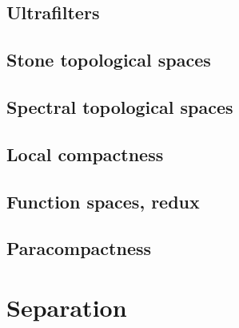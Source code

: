 \documentclass[a4paper,nobib,nols]{tufte-book}
\begin{document}
\section{Ultrafilters}%
\label{sec:ultrafilters}

\section{Stone topological spaces}%
\label{sec:stone_topological_spaces}

\section{Spectral topological spaces}%
\label{sec:spectral_topological_spaces}

\section{Local compactness}%
\label{sec:local_compactness}

\section{Function spaces, redux}%
\label{sec:function_spaces_redux}

\section{Paracompactness}%
\label{sec:paracompactness}

\chapter{Separation}%
\label{cha:separation}
\end{document}
